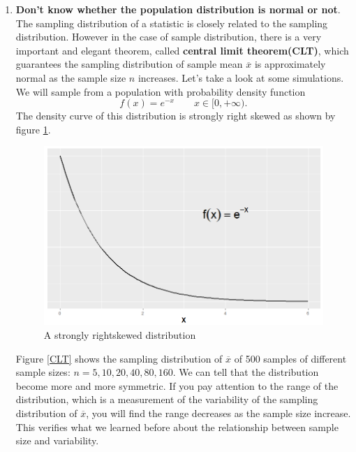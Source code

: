 \documentclass[a4paper, 12pt,twoside]{book}
\begin{document}
\begin{enumerate}[(1)]
\item \textbf{Don't know whether the population distribution is normal or not}.\vspace{0.3cm}\\
The sampling distribution of a statistic is closely related to the sampling distribution. However in the case of sample distribution, there is a very important and elegant theorem, called \textbf{central limit theorem(CLT)}, which guarantees the sampling distribution of sample mean $\overline{x}$ is approximately normal as the sample size $n$ increases. Let's take a look at some simulations.\vspace{0.3cm}\\     

    We will sample from a population with probability density function 
    $$f(x) = e^{-x}  \qquad x \in [0, +\infty).$$
    The density curve of this distribution is strongly right skewed as shown by figure \ref{GammaDistribution}. 
    
        \begin{figure}[H]
         \centering
         \includegraphics[scale=0.3]{GammaDistribution}
         \caption{A strongly right\textendash skewed distribution}
         \label{GammaDistribution}
        \end{figure}
  
    
   Figure \ref{CLT} shows the sampling distribution of $\overline{x}$ of 500 samples of different sample sizes: $n = 5, 10, 20, 40, 80, 160$. We can tell that the distribution become more and more symmetric. If you pay attention to the range of the distribution, which is a measurement of the variability of the sampling distribution of $\overline{x}$, you will find the range decreases as the sample size increase. This verifies what we learned before about the relationship between sample size and variability.


\end{enumerate}
\end{document}
